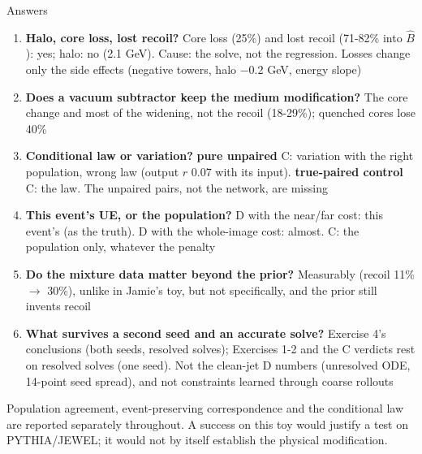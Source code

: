 \documentclass[aspectratio=169,10pt]{beamer}
\newcommand{\suplab}[2]{{\setlength{\fboxsep}{1.2pt}\colorbox{#1!14}{\scriptsize\color{#1!80!black}\textbf{#2}}}}
\newcommand{\UP}{\suplab{cUP}{pure unpaired}}
\newcommand{\TP}{\suplab{cTP}{true-paired control}}
\newcommand{\snote}[1]{{\scriptsize\color{ink2}#1\par}}
\begin{document}
\begin{frame}{Answers}
\footnotesize
\begin{enumerate}\setlength\itemsep{0.25em}
\item \textbf{Halo, core loss, lost recoil?} Core loss (25\%) and lost recoil (71-82\% into $\hat B$): yes;
  halo: no (2.1 GeV). Cause: the solve, not the regression. Losses change only the side effects
  (negative towers, halo $-$0.2 GeV, energy slope)
\item \textbf{Does a vacuum subtractor keep the medium modification?} The core change and most of the
  widening, not the recoil (18-29\%); quenched cores lose 40\%
\item \textbf{Conditional law or variation?} \UP{} C: variation with the right population, wrong law
  (output $r$ 0.07 with its input). \TP{} C: the law. The unpaired pairs, not the network, are missing
\item \textbf{This event's UE, or the population?} D with the near/far cost: this event's (as the
  truth). D with the whole-image cost: almost. C: the population only, whatever the penalty
\item \textbf{Do the mixture data matter beyond the prior?} Measurably (recoil 11\% $\to$ 30\%), unlike
  in Jamie's toy, but not specifically, and the prior still invents recoil
\item \textbf{What survives a second seed and an accurate solve?} Exercise 4's conclusions (both
  seeds, resolved solves); Exercises 1-2 and the C verdicts rest on resolved solves (one seed). Not the
  clean-jet D numbers (unresolved ODE, 14-point seed spread), and not constraints learned through coarse
  rollouts
\end{enumerate}
\vspace{0.4em}
\snote{Population agreement, event-preserving correspondence and the conditional law are reported
separately throughout. A success on this toy would justify a test on PYTHIA/JEWEL; it would not by
itself establish the physical modification.}
\end{frame}
\end{document}
